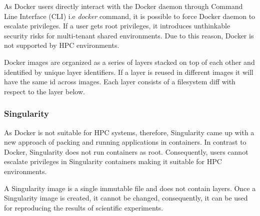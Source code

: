 \documentclass[a4paper,num-refs]{oup-contemporary}
\begin{document}

As Docker users directly interact with the
Docker daemon through Command Line Interface (CLI) i.e \textit{docker} command, it is possible to force Docker daemon to escalate privileges.
If a user gets root privileges, it
introduces unthinkable security risks for multi-tenant shared
environments. Due to this reason, Docker is not supported by
HPC environments.

Docker images are organized as a series of layers stacked on top of each
other and identified by unique layer identifiers. If a layer is reused
in different images it will
have the same id across images. Each layer consists of a filesystem diff
with respect to the layer below.

\subsubsection{Singularity}

As Docker is not suitable for HPC systems, therefore, Singularity came up with a new approach
of packing and running applications in containers. 
In contrast to Docker,
Singularity does not run containers as root. Consequently, users cannot escalate
privileges in Singularity containers making it suitable for HPC environments.

A Singularity image is a single immutable file and
does not contain layers.
Once a Singularity image is created, it cannot be changed, consequently,
it can be used for reproducing the results of scientific
experiments.
\end{document}
